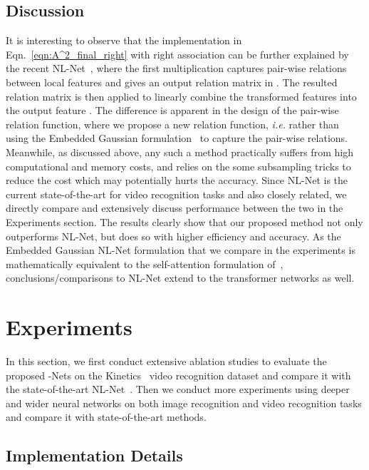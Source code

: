 \documentclass{article}
\begin{document}
\subsection{Discussion}
It is interesting to observe that the implementation in Eqn.~\eqref{eqn:A^2_final_right} with right association can be further explained by the recent NL-Net~\cite{wang17non}, where the first multiplication captures pair-wise relations between local features and gives an output relation matrix in . The resulted relation matrix is then applied to linearly combine the transformed features  into the output feature . The difference is apparent in the design of the pair-wise relation function, where we propose a new relation function, \emph{i.e.}  rather than using the Embedded Gaussian formulation~\cite{vaswani2017attention} to capture the pair-wise relations. Meanwhile, as discussed above, any such a method practically suffers from high computational and memory costs, and relies on the some subsampling tricks to reduce the cost which may potentially hurts the accuracy. Since NL-Net is the current state-of-the-art for video recognition tasks and also closely related, we directly compare and extensively discuss performance between the two in the Experiments section. The results clearly show that our proposed method not only outperforms NL-Net, but does so with higher efficiency and accuracy.
As the Embedded Gaussian NL-Net formulation that we compare in the experiments is mathematically equivalent to the self-attention formulation of~\cite{vaswani2017attention}, conclusions/comparisons to NL-Net extend to the transformer networks as well.
 






 
\section{Experiments}
\label{sec:experiments}

In this section, we first conduct extensive ablation studies to evaluate the proposed -Nets on the Kinetics~\cite{kay2017kinetics} video recognition dataset and compare it with the state-of-the-art NL-Net~\cite{wang17non}. Then we conduct more experiments using deeper and wider neural networks on both image recognition  and video recognition tasks and compare it with state-of-the-art methods. 
 
\subsection{Implementation Details}
\end{document}
